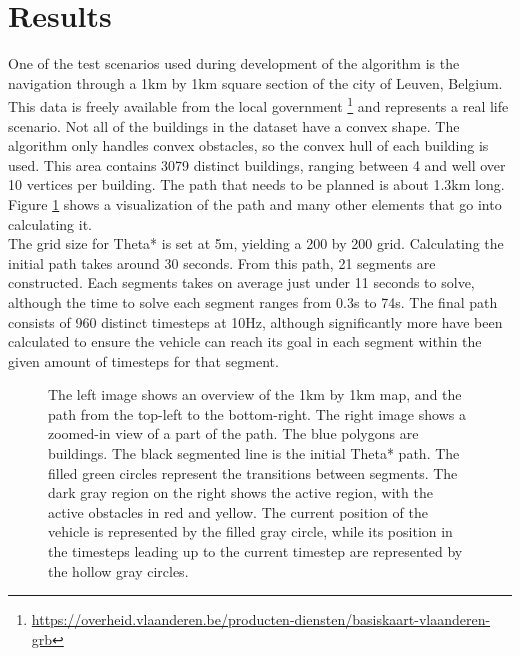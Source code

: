 \section{Results}
One of the test scenarios used during development of the algorithm is the navigation through a 1km by 1km square section of the city of Leuven, Belgium. This data is freely available from the local government \footnote{\url{https://overheid.vlaanderen.be/producten-diensten/basiskaart-vlaanderen-grb}} and represents a real life scenario. Not all of the buildings in the dataset have a convex shape. The algorithm only handles convex obstacles, so the convex hull of each building is used. This area contains 3079 distinct buildings, ranging between 4 and well over 10 vertices per building. The path that needs to be planned is about 1.3km long. Figure \ref{fig:example} shows a visualization of the path and many other elements that go into calculating it.
\\
The grid size for Theta* is set at 5m, yielding a 200 by 200 grid. Calculating the initial path takes around 30 seconds. From this path, 21 segments are constructed. Each segments takes on average just under 11 seconds to solve, although the time to solve each segment ranges from 0.3s to 74s. The final path consists of 960 distinct timesteps at 10Hz, although significantly more have been calculated to ensure the vehicle can reach its goal in each segment within the given amount of timesteps for that segment.
\begin{figure}[!t]
    \centering


    \hfil

    \caption{The left image shows an overview of the 1km by 1km map, and the path from the top-left to the bottom-right. The right image shows a zoomed-in view of a part of the path. The blue polygons are buildings. The black segmented line is the initial Theta* path. The filled green circles represent the transitions between segments. The dark gray region on the right shows the active region, with the active obstacles in red and yellow. The current position of the vehicle is represented by the filled gray circle, while its position in the timesteps leading up to the current timestep are represented by the hollow gray circles.}\label{fig:example}
\end{figure}
